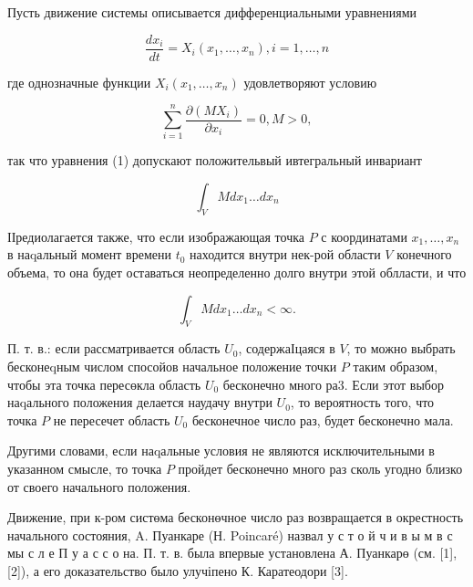 \documentclass[10pt]{article}
\begin{document}
Пусть движение системы описывается дифференциальными уравнениями



\[

\frac{d x_{i}}{d t}=X_{i}\left(x_{1}, \ldots, x_{n}\right), i=1, \ldots, n

\]



где однозначные функции $X_{i}\left(x_{1}, \ldots, x_{n}\right)$ удовлетворяют условию



\[

\sum_{i=1}^{n} \frac{\partial\left(M X_{i}\right)}{\partial x_{i}}=0, M>0,

\]



так что уравнения (1) допускают положительвый ивтегральный инвариант



\[

\int_{V} M d x_{1} \ldots d x_{n}

\]



ІІредиолагается также, что если изображающая точка $P$ с координатами $x_{1}, \ldots, x_{n}$ в наqальный момент времени $t_{0}$ находится внутри нек-рой области $V$ конечного объема, то она будет оставаться неопределенно долго внутри этой облласти, и что



\[

\int_{V} M d x_{1} \ldots d x_{n}<\infty .

\]



П. т. в.: если рассматривается область $U_{0}$, содержаІцаяся в $V$, то можно выбрать бесконеqным числом спосойов начальное положение точки $P$ таким образом, чтобы эта точка пересөкла область $U_{0}$ бесконечно много ра3. Если этот выбор наqального положения делается наудачу внутри $U_{0}$, то вероятность того, что точка $P$ не пересечет область $U_{0}$ бесконечное число раз, будет бесконечно мала.



Другими словами, если наqальные условия не являются исключительными в указанном смысле, то точка $P$ пройдет бесконечно много раз сколь угодно близко от своего начального положения.



Движение, при к-ром систөма бесконөчное число раз возвращается в окрестность начального состояния, A. Пуанкаре (Н. Poincaré) назвал у с т о й ч и в ы м в с мы с л е П у а с с о на. П. т. в. была впервые установлена А. Пуанкарө (см. [1], [2]), а его доказательство было улучіпено К. Каратеодори [3].
\end{document}
